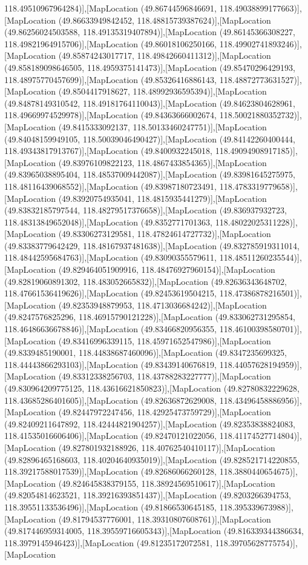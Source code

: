 118.49510967964284)],[MapLocation (49.86744596846691, 118.49038899177663)],[MapLocation (49.86633949842452, 118.48815739387624)],[MapLocation (49.86256024503588, 118.49135319407894)],[MapLocation (49.86145366308227, 118.49821964915706)],[MapLocation (49.86018106250166, 118.49902741893246)],[MapLocation (49.85874243017717, 118.49842660411312)],[MapLocation (49.858189098646505, 118.4959375141473)],[MapLocation (49.85470296429193, 118.48975770457699)],[MapLocation (49.85326416886143, 118.48872773631527)],[MapLocation (49.8504417918627, 118.48992936595394)],[MapLocation (49.84878149310542, 118.49181764110043)],[MapLocation (49.84623804628961, 118.49669974529978)],[MapLocation (49.84363666002674, 118.50021880352732)],[MapLocation (49.8415333092137, 118.50133460247751)],[MapLocation (49.84048159949105, 118.50039046490427)],[MapLocation (49.84142260400444, 118.49343817913767)],[MapLocation (49.8400932245018, 118.49094908917185)],[MapLocation (49.83976109822123, 118.4867433854365)],[MapLocation (49.83965038895404, 118.48537009442087)],[MapLocation (49.83981645275975, 118.48116439068552)],[MapLocation (49.83987180723491, 118.4783319779658)],[MapLocation (49.83920754935041, 118.4815935441279)],[MapLocation (49.83832185797544, 118.48279517376658)],[MapLocation (49.836937932723, 118.48313849652048)],[MapLocation (49.8352771701363, 118.48022025311228)],[MapLocation (49.83306273129581, 118.47824614727732)],[MapLocation (49.83383779642429, 118.48167937481638)],[MapLocation (49.832785919311014, 118.48442595684763)],[MapLocation (49.83090355579611, 118.48511260235544)],[MapLocation (49.829464051909916, 118.48476927960154)],[MapLocation (49.82819060891302, 118.483052665832)],[MapLocation (49.82636343648702, 118.47661536419626)],[MapLocation (49.82453619504215, 118.47386878216501)],[MapLocation (49.82353948879953, 118.4713036684242)],[MapLocation (49.8247576825296, 118.46915790121228)],[MapLocation (49.833062731295854, 118.46486636678846)],[MapLocation (49.83466820956355, 118.46100398580701)],[MapLocation (49.83416996339115, 118.45971652547986)],[MapLocation (49.8339485190001, 118.44838687460096)],[MapLocation (49.8347235699325, 118.44443866293103)],[MapLocation (49.83439140676819, 118.44057628194959)],[MapLocation (49.83312338256703, 118.43788283227777)],[MapLocation (49.830964209775125, 118.43616621850823)],[MapLocation (49.82780832229628, 118.43685286401605)],[MapLocation (49.82636872629008, 118.43496458886956)],[MapLocation (49.82447972247456, 118.42925473759729)],[MapLocation (49.82409211647892, 118.42444821904257)],[MapLocation (49.82353838824083, 118.41535016606406)],[MapLocation (49.82470121022056, 118.41174527714804)],[MapLocation (49.827801932188926, 118.40762540410117)],[MapLocation (49.82896465168603, 118.40204640935019)],[MapLocation (49.828521714220855, 118.39217588017539)],[MapLocation (49.82686066260128, 118.3880440654675)],[MapLocation (49.824645838379155, 118.38924569510617)],[MapLocation (49.82054814623521, 118.39216393851437)],[MapLocation (49.8203266394753, 118.39551133536496)],[MapLocation (49.81866530645185, 118.395339673988)],[MapLocation (49.81794537776001, 118.39310807608761)],[MapLocation (49.817446959314005, 118.39559716605343)],[MapLocation (49.816339344386634, 118.3979145946423)],[MapLocation (49.81235172072581, 118.39705628775754)],[MapLocation 